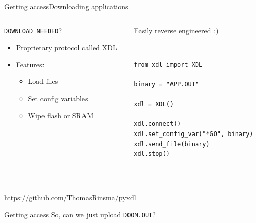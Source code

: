 \documentclass[12pt,aspectratio=169]{beamer}
\begin{document}
\begin{frame}[fragile]{Getting access}{Downloading applications}
\begin{columns}
	\begin{column}{0.5\textwidth}
		\texttt{DOWNLOAD NEEDED}?
		\begin{itemize}
			\item Proprietary protocol called XDL
			\item Features:
			\begin{itemize}
				\item Load files
				\item Set config variables
				\item Wipe flash or SRAM
			\end{itemize}
		\end{itemize}
	\end{column}
	\begin{column}{0.5\textwidth}
			\pause
			Easily reverse engineered :)

			~

			\begin{verbatim}
from xdl import XDL

binary = "APP.OUT"

xdl = XDL()

xdl.connect()
xdl.set_config_var("*GO", binary)
xdl.send_file(binary)
xdl.stop()
			\end{verbatim}
	\end{column}
\end{columns}
~\\~\\
\url{https://github.com/ThomasRinsma/pyxdl}
\end{frame}



\begin{frame}{Getting access}
	So, can we just upload \texttt{DOOM.OUT}?
\end{frame}
\end{document}
